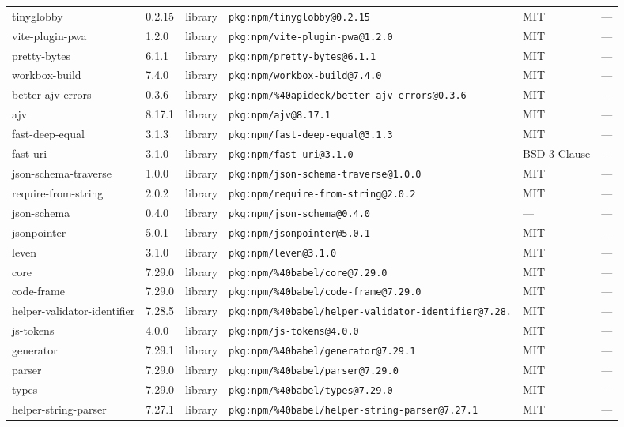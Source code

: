 \documentclass[11pt]{article}
\begin{document}
\begin{longtable}{|l|l|l|p{2.2cm}|l|p{4cm}|}
tinyglobby & 0.2.15 & library & \texttt{pkg:npm/tinyglobby@0.2.15} & MIT & — \\
vite-plugin-pwa & 1.2.0 & library & \texttt{pkg:npm/vite-plugin-pwa@1.2.0} & MIT & — \\
pretty-bytes & 6.1.1 & library & \texttt{pkg:npm/pretty-bytes@6.1.1} & MIT & — \\
workbox-build & 7.4.0 & library & \texttt{pkg:npm/workbox-build@7.4.0} & MIT & — \\
better-ajv-errors & 0.3.6 & library & \texttt{pkg:npm/\%40apideck/better-ajv-errors@0.3.6} & MIT & — \\
ajv & 8.17.1 & library & \texttt{pkg:npm/ajv@8.17.1} & MIT & — \\
fast-deep-equal & 3.1.3 & library & \texttt{pkg:npm/fast-deep-equal@3.1.3} & MIT & — \\
fast-uri & 3.1.0 & library & \texttt{pkg:npm/fast-uri@3.1.0} & BSD-3-Clause & — \\
json-schema-traverse & 1.0.0 & library & \texttt{pkg:npm/json-schema-traverse@1.0.0} & MIT & — \\
require-from-string & 2.0.2 & library & \texttt{pkg:npm/require-from-string@2.0.2} & MIT & — \\
json-schema & 0.4.0 & library & \texttt{pkg:npm/json-schema@0.4.0} & — & — \\
jsonpointer & 5.0.1 & library & \texttt{pkg:npm/jsonpointer@5.0.1} & MIT & — \\
leven & 3.1.0 & library & \texttt{pkg:npm/leven@3.1.0} & MIT & — \\
core & 7.29.0 & library & \texttt{pkg:npm/\%40babel/core@7.29.0} & MIT & — \\
code-frame & 7.29.0 & library & \texttt{pkg:npm/\%40babel/code-frame@7.29.0} & MIT & — \\
helper-validator-identifier & 7.28.5 & library & \texttt{pkg:npm/\%40babel/helper-validator-identifier@7.28.} & MIT & — \\
js-tokens & 4.0.0 & library & \texttt{pkg:npm/js-tokens@4.0.0} & MIT & — \\
generator & 7.29.1 & library & \texttt{pkg:npm/\%40babel/generator@7.29.1} & MIT & — \\
parser & 7.29.0 & library & \texttt{pkg:npm/\%40babel/parser@7.29.0} & MIT & — \\
types & 7.29.0 & library & \texttt{pkg:npm/\%40babel/types@7.29.0} & MIT & — \\
helper-string-parser & 7.27.1 & library & \texttt{pkg:npm/\%40babel/helper-string-parser@7.27.1} & MIT & — \\

\end{longtable}
\end{document}
